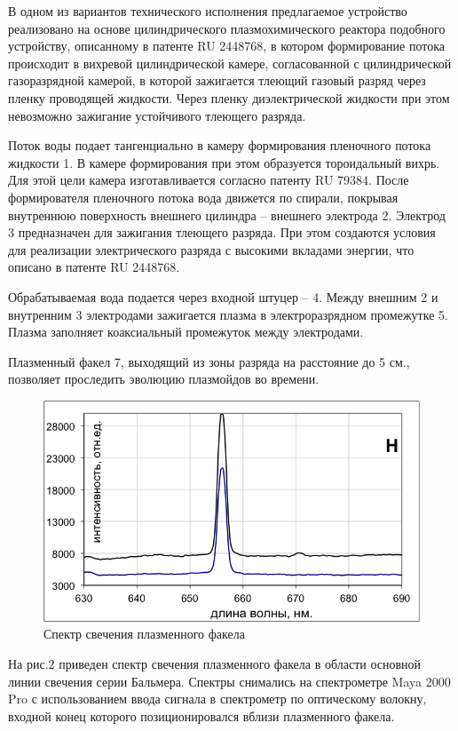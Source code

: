 \documentclass[a4paper]{article}
\begin{document}
В одном из вариантов технического исполнения предлагаемое устройство реализовано на основе цилиндрического плазмохимического реактора подобного устройству, описанному в патенте RU 2448768, в котором формирование потока происходит в вихревой цилиндрической камере, согласованной с цилиндрической газоразрядной камерой, в которой зажигается тлеющий газовый разряд через пленку проводящей жидкости. Через пленку диэлектрической жидкости при этом невозможно зажигание устойчивого тлеющего разряда.

Поток воды подает тангенциально в камеру формирования пленочного потока жидкости 1. В камере формирования при этом образуется тороидальный вихрь. Для этой цели камера изготавливается согласно патенту RU 79384. После формирователя пленочного потока вода движется по спирали, покрывая внутреннюю поверхность внешнего цилиндра – внешнего электрода 2. Электрод 3 предназначен для зажигания тлеющего разряда. При этом создаются условия для реализации электрического разряда с высокими вкладами энергии, что описано в патенте RU 2448768.

Обрабатываемая вода подается через входной штуцер – 4. Между внешним 2 и внутренним 3 электродами зажигается  плазма в электроразрядном промежутке 5. Плазма заполняет коаксиальный промежуток между электродами. 

Плазменный факел 7, выходящий из зоны разряда на расстояние до 5 см., позволяет проследить эволюцию плазмойдов во времени. 

\newpage

\begin{figure}[h]
    \includegraphics{plot.png}
    \centering
    \caption{Спектр свечения плазменного факела}
\end{figure}

На рис.2 приведен спектр свечения плазменного факела в области основной линии свечения серии Бальмера. Спектры снимались на спектрометре Maya 2000 Pro с использованием ввода сигнала в спектрометр по оптическому волокну, входной конец которого позиционировался вблизи плазменного факела.
\end{document}
